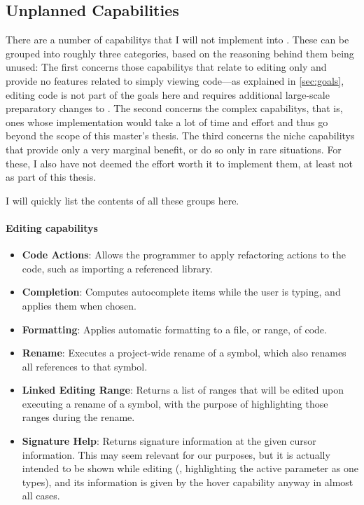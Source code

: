 \documentclass[../thesis]{subfiles}
\begin{document}
\subsection{Unplanned Capabilities}\label{subsec:unplanned}
There are a number of \glspl{capability} that I will not implement into \SEE{}.
These can be grouped into roughly three categories, based on the reasoning behind them being unused:
The first concerns those \glspl{capability} that relate to editing only and provide no features related to simply viewing code---as explained in \cref{sec:goals}, editing code is not part of the goals here and requires additional large-scale preparatory changes to \SEE{}.
The second concerns the complex \glspl{capability}, that is, ones whose implementation would take a lot of time and effort and thus go beyond the scope of this master's thesis.
The third concerns the niche \glspl{capability} that provide only a very marginal benefit, or do so only in rare situations.
For these, I also have not deemed the effort worth it to implement them, at least not as part of this thesis.

I will quickly list the contents of all these groups here.

\paragraph{Editing \glspl{capability}}
\begin{itemize}
	\item \textbf{Code Actions}: Allows the programmer to apply refactoring actions to the code, such as importing a referenced library.
	\item \textbf{Completion}: Computes autocomplete items while the user is typing, and applies them when chosen.
	\item \textbf{Formatting}: Applies automatic formatting to a file, or range, of code.
	\item \textbf{Rename}: Executes a project-wide rename of a symbol, which also renames all references to that symbol.
	\item \textbf{Linked Editing Range}: Returns a list of \glspl{range} that will be edited upon executing a rename of a symbol, with the purpose of highlighting those ranges during the rename.
	\item \textbf{Signature Help}: Returns signature information at the given cursor information.
	      This may seem relevant for our purposes, but it is actually intended to be shown while editing (\eg, highlighting the active parameter as one types), and its information is given by the hover \gls{capability} anyway in almost all cases.
\end{itemize}
\end{document}
